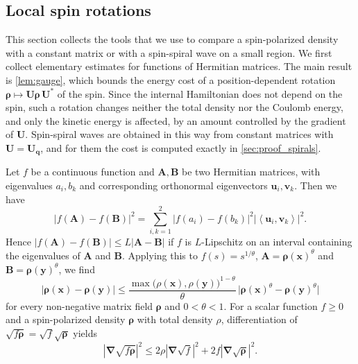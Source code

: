 \documentclass[final,reqno]{amsart}
\theoremstyle{remark}
\renewcommand{\le}{\leqslant}
\renewcommand{\ge}{\geqslant}
\newcommand{\pscal}[1]{\left\langle #1 \right\rangle}
\newcommand{\grad}{\bm{\nabla}}
\begin{document}
\subsection{Local spin rotations}\label{sec:deviation}
This section collects the tools that we use to compare a spin-polarized density with a constant matrix or with a spin-spiral wave on a small region. We first collect elementary estimates for functions of Hermitian matrices. The main result is \cref{lem:gauge}, which bounds the energy cost of a position-dependent rotation $\bm{\rho}\mapsto\mathbf{U}\bm{\rho}\,\mathbf{U}^*$ of the spin. Since the internal Hamiltonian does not depend on the spin, such a rotation changes neither the total density nor the Coulomb energy, and only the kinetic energy is affected, by an amount controlled by the gradient of $\mathbf{U}$. Spin-spiral waves are obtained in this way from constant matrices with $\mathbf{U}=\mathbf{U}_{\mathbf{q}}$, and for them the cost is computed exactly in \cref{sec:proof_spirals}.

Let $f$ be a continuous function and $\mathbf{A},\mathbf{B}$ be two Hermitian matrices, with eigenvalues $a_i,b_k$ and corresponding orthonormal eigenvectors $\mathbf{u}_i,\mathbf{v}_k$. Then we have
\begin{equation}\label{eq:HS_functions}
|f(\mathbf{A})-f(\mathbf{B})|^2=\sum_{i,k=1}^2|f(a_i)-f(b_k)|^2|\pscal{\mathbf{u}_i,\mathbf{v}_k}|^2.
\end{equation}
Hence $|f(\mathbf{A})-f(\mathbf{B})|\le L|\mathbf{A}-\mathbf{B}|$ if $f$ is $L$-Lipschitz on an interval containing the eigenvalues of $\mathbf{A}$ and $\mathbf{B}$. Applying this to $f(s)=s^{1/\theta}$, $\mathbf{A}=\bm{\rho}(\mathbf{x})^\theta$ and $\mathbf{B}=\bm{\rho}(\mathbf{y})^\theta$, we find
\begin{equation}\label{eq:Lipschitz_power}
|\bm{\rho}(\mathbf{x})-\bm{\rho}(\mathbf{y})|\le \frac{\max\big(\rho(\mathbf{x}),\rho(\mathbf{y})\big)^{1-\theta}}{\theta}\,\big|\bm{\rho}(\mathbf{x})^\theta-\bm{\rho}(\mathbf{y})^\theta\big|
\end{equation}
for every non-negative matrix field $\bm{\rho}$ and $0<\theta<1$. For a scalar function $f\ge0$ and a spin-polarized density $\bm{\rho}$ with total density $\rho$, differentiation of $\sqrt{f\bm{\rho}}=\sqrt f\sqrt{\bm{\rho}}$ yields
\begin{equation}\label{eq:gradient_product}
|\grad\sqrt{f\bm{\rho}}|^2\le 2\rho|\grad\sqrt f|^2+2f|\grad\sqrt{\bm{\rho}}|^2 .
\end{equation}
\end{document}
